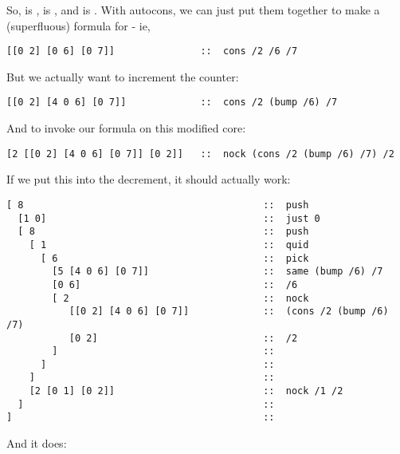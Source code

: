 So,  is \kode{[0 2]},  is \kode{[0 6]}, and  is
\kode{[0 7]}.  With autocons, we can just put them together to make a
(superfluous) formula for  - ie,

\begin{framed_shaded}
\begin{Verbatim}[fontsize=\relsize{-2.5},fontseries=b,commandchars=\\\{\}]
[[0 2] [0 6] [0 7]]               ::  cons /2 /6 /7
\end{Verbatim}
\end{framed_shaded}
But we actually want to increment the counter:

\begin{framed_shaded}
\begin{Verbatim}[fontsize=\relsize{-2.5},fontseries=b,commandchars=\\\{\}]
[[0 2] [4 0 6] [0 7]]             ::  cons /2 (bump /6) /7
\end{Verbatim}
\end{framed_shaded}
And to invoke our formula on this modified core:

\begin{framed_shaded}
\begin{Verbatim}[fontsize=\relsize{-2.5},fontseries=b,commandchars=\\\{\}]
[2 [[0 2] [4 0 6] [0 7]] [0 2]]   ::  nock (cons /2 (bump /6) /7) /2
\end{Verbatim}
\end{framed_shaded}
If we put this into the decrement, it should actually work:

\begin{framed_shaded}
\begin{Verbatim}[fontsize=\relsize{-2.5},fontseries=b,commandchars=\\\{\}]
[ 8                                          ::  push
  [1 0]                                      ::  just 0
  [ 8                                        ::  push
    [ 1                                      ::  quid
      [ 6                                    ::  pick
        [5 [4 0 6] [0 7]]                    ::  same (bump /6) /7
        [0 6]                                ::  /6
        [ 2                                  ::  nock
           [[0 2] [4 0 6] [0 7]]             ::  (cons /2 (bump /6) /7)
           [0 2]                             ::  /2
        ]                                    ::
      ]                                      ::
    ]                                        ::
    [2 [0 1] [0 2]]                          ::  nock /1 /2
  ]                                          ::
]                                            ::
\end{Verbatim}
\end{framed_shaded}
And it does:

